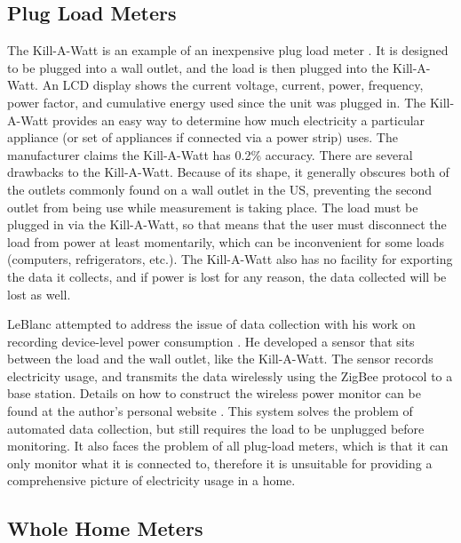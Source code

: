 \subsection{Plug Load Meters}
\label{sec:plug-load-meters}

The Kill-A-Watt is an example of an inexpensive plug load meter \cite{kill-a-watt}. It is designed to be plugged into a wall outlet, and the load is then plugged into the Kill-A-Watt. An LCD display shows the current voltage, current, power, frequency, power factor, and cumulative energy used since the unit was plugged in. The Kill-A-Watt provides an easy way to determine how much electricity a particular appliance (or set of appliances if connected via a power strip) uses. The manufacturer claims the Kill-A-Watt has 0.2\% accuracy. There are several drawbacks to the Kill-A-Watt. Because of its shape, it generally obscures both of the outlets commonly found on a wall outlet in the US, preventing the second outlet from being use while measurement is taking place. The load must be plugged in via the Kill-A-Watt, so that means that the user must disconnect the load from power at least momentarily, which can be inconvenient for some loads (computers, refrigerators, etc.). The Kill-A-Watt also has no facility for exporting the data it collects, and if power is lost for any reason, the data collected will be lost as well. 

LeBlanc attempted to address the issue of data collection with his work on recording device-level power consumption \cite{leblanc-2007}. He developed a sensor that sits between the load and the wall outlet, like the Kill-A-Watt. The sensor records electricity usage, and transmits the data wirelessly using the ZigBee protocol to a base station. Details on how to construct the wireless power monitor can be found at the author's personal website \cite{LeBlanc2008power-mon-howto}. This system solves the problem of automated data collection, but still requires the load to be unplugged before monitoring. It also faces the problem of all plug-load meters, which is that it can only monitor what it is connected to, therefore it is unsuitable for providing a comprehensive picture of electricity usage in a home.


\subsection{Whole Home Meters}
\label{sec:whole-home-meters}

